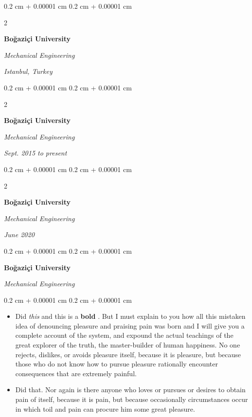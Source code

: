 \documentclass[10pt, letterpaper]{article}
\newenvironment{highlights}{
    \begin{itemize}[
        topsep=0.10 cm,
        parsep=0.10 cm,
        partopsep=0pt,
        itemsep=0pt,
        leftmargin=0.4 cm + 10pt
    ]
}{
    \end{itemize}
} %
\newenvironment{onecolentry}{
    \begin{adjustwidth}{
        0.2 cm + 0.00001 cm
    }{
        0.2 cm + 0.00001 cm
    }
}{
    \end{adjustwidth}
} %
\newenvironment{twocolentry}[2][]{
    \onecolentry
    \def\secondColumn{#2}
    \setcolumnwidth{\fill, 4.5 cm}
    \begin{paracol}{2}
}{
    \switchcolumn \raggedleft \secondColumn
    \end{paracol}
    \endonecolentry
} %
\let\hrefWithoutArrow\href
\renewcommand{\href}[2]{\hrefWithoutArrow{#1}{\mbox{\ifthenelse{\equal{#2}{}}{ }{#2 }\raisebox{.15ex}{\footnotesize \faExternalLink*}}}}
\begin{document}
        \vspace{0.2 cm-3px}

        \begin{twocolentry}{
        \textit{Istanbul, Turkey}    
            
        }
            \textbf{Boğaziçi University}

            \textit{Mechanical Engineering}
        \end{twocolentry}



        \vspace{0.2 cm-3px}

        \begin{twocolentry}{
            
            
        \textit{Sept. 2015 to present}}
            \textbf{Boğaziçi University}

            \textit{Mechanical Engineering}
        \end{twocolentry}



        \vspace{0.2 cm-3px}

        \begin{twocolentry}{
            
            
        \textit{June 2020}}
            \textbf{Boğaziçi University}

            \textit{Mechanical Engineering}
        \end{twocolentry}



        \vspace{0.2 cm-3px}

        \begin{onecolentry}
            \textbf{Boğaziçi University}

            \textit{Mechanical Engineering}
        \end{onecolentry}

        \vspace{0.10 cm-3px}
        \begin{onecolentry}
            \begin{highlights}
                \item Did \textit{this} and this is a \textbf{bold} \href{https://example.com}{link}. But I must explain to you how all this mistaken idea of denouncing pleasure and praising pain was born and I will give you a complete account of the system, and expound the actual teachings of the great explorer of the truth, the master-builder of human happiness. No one rejects, dislikes, or avoids pleasure itself, because it is pleasure, but because those who do not know how to pursue pleasure rationally encounter consequences that are extremely painful.
                \item Did that. Nor again is there anyone who loves or pursues or desires to obtain pain of itself, because it is pain, but because occasionally circumstances occur in which toil and pain can procure him some great pleasure.
            \end{highlights}
        \end{onecolentry}
\end{document}
